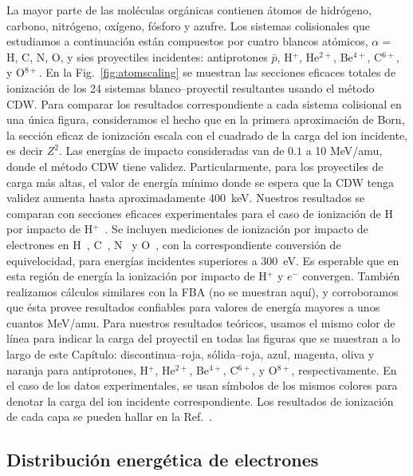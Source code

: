La mayor parte de las moléculas orgánicas contienen átomos de hidrógeno, 
carbono, nitrógeno, oxígeno, fósforo y azufre. Los sistemas colisionales
que estudiamos a continuación están compuestos por cuatro blancos 
atómicos, $\alpha=$ H, C, N, O, y sies proyectiles incidentes: 
antiprotones $\bar{p}$, H$^{+}$, He$^{2+}$, Be$^{4+}$, C$^{6+}$, y 
O$^{8+}$. En la Fig.~\ref{fig:atomscaling} se muestran las secciones 
eficaces totales de ionización de los 24 sistemas blanco--proyectil 
resultantes usando el método CDW. Para comparar los resultados 
correspondiente a cada sistema colisional en una única figura, 
consideramos el hecho que en la primera aproximación de Born, la sección 
eficaz de ionización escala con el cuadrado de la carga del ion 
incidente, es decir $Z^{2}$. Las energías de impacto consideradas van de 
$0.1$ a 10 MeV/amu, donde el método CDW tiene validez. Particularmente, 
para los proyectiles de carga más altas, el valor de energía mínimo donde 
se espera que la CDW tenga validez aumenta hasta aproximadamente 400~keV. 
Nuestros resultados se comparan con secciones eficaces experimentales 
para el caso de ionización de H por impacto de H$^+$~\cite{Shah:81}. Se 
incluyen mediciones de ionización por impacto de electrones en 
H~\cite{Shah:87}, C~\cite{Brook:78}, N~\cite{Brook:78} y 
O~\cite{Thompson:95}, con la correspondiente conversión de equivelocidad, 
para energías incidentes superiores a 300~eV. Es esperable que en esta 
región de energía la ionización por impacto de H$^+$ y $e^-$ convergen. 
También realizamos cálculos similares con la FBA (no se muestran aquí), 
y corroboramos que ésta provee resultados confiables para valores de 
energía mayores a unos cuantos MeV/amu. Para nuestros resultados teóricos,
usamos el mismo color de línea para indicar la carga del proyectil en 
todas las figuras que se muestran a lo largo de este Capítulo: 
discontinua--roja, sólida--roja, azul, magenta, oliva y naranja para 
antiprotones, H$^{+}$, He$^{2+}$, Be$^{4+}$, C$^{6+}$, y O$^{8+}$, 
respectivamente. En el caso de los datos experimentales, se usan símbolos 
de los mismos colores para denotar la carga del ion incidente 
correspondiente. Los resultados de ionización de cada capa se pueden 
hallar en la Ref.~\cite{Miraglia:19}.

\subsection{Distribución energética de electrones}
\label{subsec:meanener}

